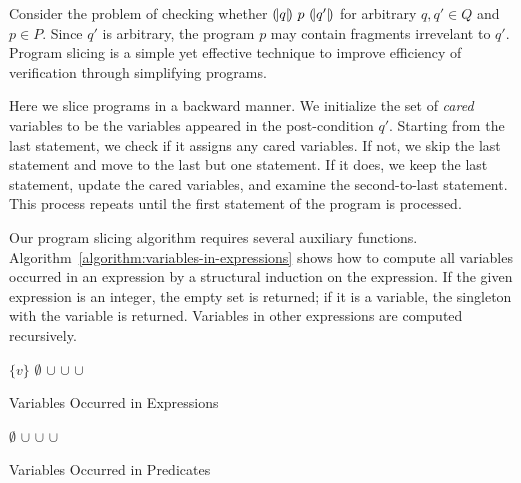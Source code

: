 
Consider the problem of checking whether ${(\!|}{q}{|\!)}~{p}~{(\!|}{q'}{|\!)}$ for
arbitrary $q, q' \in Q$ and $p \in P$. Since $q'$ is arbitrary, the
program $p$ may contain fragments irrevelant to $q'$. Program slicing
is a simple yet effective technique to improve efficiency of
verification through simplifying programs.  

Here we slice programs in a backward manner. We initialize the set
of \emph{cared} variables to be the variables appeared in the
post-condition $q'$. Starting from the last statement, we check if
it assigns any cared variables. If not, we skip the last statement and
move to the last but one statement. If it does, we keep the last
statement, update the cared variables, and examine the second-to-last
statement. This process repeats until the first statement of the
program is processed.

Our program slicing algorithm requires several auxiliary functions. 
Algorithm~\ref{algorithm:variables-in-expressions} shows how to
compute all variables occurred in an expression by a structural
induction on the expression. If the given expression is an integer,
the empty set is returned; if it is a variable, the singleton with the
variable is returned. Variables in other expressions are computed
recursively. 

\begin{algorithm}
  \begin{algorithmic}[1]
        \Return $\{ v \}$
      \EndCase
        \Return $\emptyset$
      \EndCase
        \Return {}
      \EndCase
        \Return {} $\cup$ 
      \EndCase
        \Return {} $\cup$ 
      \EndCase
        \Return {} $\cup$ 
      \EndCase
        \Return {}
      \EndCase
    \EndMatch
    \EndFunction
  \end{algorithmic}
  \caption{Variables Occurred in Expressions}
  \label{algorithm:variables-in-expressions}
\end{algorithm}

\begin{algorithm}
\begin{algorithmic}[1]
    \Case{$\top$}
      $\emptyset$
    \EndCase
      \Return {} $\cup$ 
    \EndCase
      \Return {} $\cup$ 
    \EndCase
      \Return {} $\cup$ 
    \EndCase
  \EndMatch
  \EndFunction
\end{algorithmic}
\caption{Variables Occurred in Predicates}
\label{algorithm:variables-in-predicates}
\end{algorithm}

